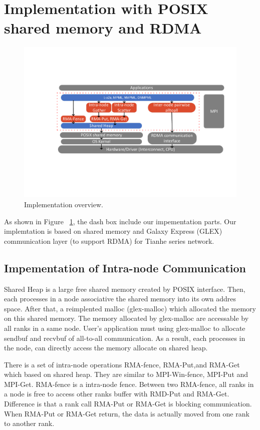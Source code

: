 \section {Implementation with POSIX shared memory and RDMA}


  \begin{figure}
    \centering
    \includegraphics[width=16cm]{./Figures/implementaion.pdf} %
    \caption{Implementation overview.} %
    \label{fig:Implementation}
    \end{figure}


As shown in Figure ~\ref{fig:Implementation}, the dash box include our impementation parts.
Our implemtation is based on shared memory and Galaxy Express (GLEX) communication layer (to support RDMA) for Tianhe series network.

\subsection {Impementation of Intra-node Communication}
Shared Heap \cite{friedley2013hybrid} is a large free shared memory  created by POSIX interface.
Then, each processes in a node associative the shared memory into its own addres space.
After that, a reimplented malloc (glex-malloc) which allocated the memory on this shared memory.
The memory allocated by glex-malloc are accessable by all ranks in a same node.
User's application must using glex-malloc to allocate sendbuf and recvbuf of all-to-all communication.
As a result, each processes in the node, can directly access the memory allocate on shared heap.

There is a set of intra-node operations RMA-fence, RMA-Put,and RMA-Get which based on shared heap. 
They are similar to MPI-Win-fence, MPI-Put and MPI-Get.
RMA-fence is a intra-node fence.
Between two RMA-fence, all ranks in a node is free to access other ranks buffer with RMD-Put and RMA-Get.
Difference is that a rank call RMA-Put or RMA-Get is blocking communication.
When  RMA-Put or RMA-Get return, the data is actually moved from one rank to another rank.


